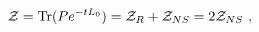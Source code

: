 \begin{equation}
 {\cal Z}=\mathrm{Tr}( P e^{-tL_0})={\cal Z}_R+{\cal Z}_{NS}=2{\cal Z}_{NS}\ , 
\end{equation}

